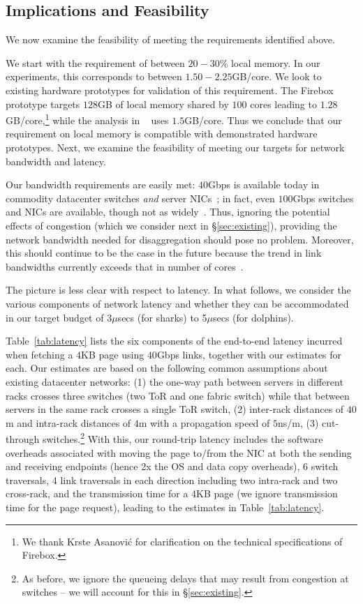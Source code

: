 \subsection{Implications and Feasibility}
\label{ssec:rtt}

We now examine the feasibility of meeting the requirements identified above. 

 We start with the requirement of between $20-30$\% local memory. In our experiments, this corresponds to between $1.50-2.25$GB/core. We look to existing hardware prototypes for validation of this requirement. The Firebox prototype targets $128$GB of local memory shared by $100$ cores leading to $1.28$GB/core,\footnote{We thank Krste Asanovi{\'c} for clarification on the technical specifications of Firebox.} while the analysis in ~\cite{ddcHwDesign1} uses $1.5$GB/core. Thus we conclude that our requirement on local memory is compatible with demonstrated hardware prototypes.
Next, we examine the feasibility of meeting our targets for network bandwidth and latency.


 Our bandwidth requirements are easily met: $40$Gbps is available today in commodity datacenter switches \emph{and} server NICs~\cite{40gnic}; in fact, even $100$Gbps switches and NICs are available, though not as widely~\cite{100gnic}.
Thus, ignoring the potential effects of congestion (which we consider next in \S\ref{sec:existing}), providing the network bandwidth needed for disaggregation should pose no problem. Moreover, this should continue to be the case in the future because the trend in link bandwidths currently exceeds that in number of cores~\cite{hmc1, hmc2, hmc3}.


 The picture is less clear with respect to latency. In what follows, we consider the various components of network latency and whether they can be accommodated in our target budget of 3$\mu$secs (for sharks) to 5$\mu$secs (for dolphins).

Table~\ref{tab:latency} lists the six components of the end-to-end latency incurred when fetching  a $4$KB page using $40$Gbps links, together with our estimates for each. Our estimates are based on the following common assumptions about existing datacenter networks: (1) the one-way path between servers in different racks crosses three switches (two ToR and one fabric switch) while that between servers in the same rack crosses a single ToR switch, (2) inter-rack distances of $40$m and intra-rack distances of $4$m with a propagation speed of $5$ns/m, (3) cut-through switches.\footnote{As before, we ignore the queueing delays that may result from congestion at switches -- we will account for this in \S\ref{sec:existing}.}  
With this, our round-trip latency includes the software overheads associated with moving the page to/from the NIC at both the sending and receiving endpoints (hence 2x the OS and data copy overheads), 6 switch traversals, 4 link traversals in each direction including two intra-rack and two cross-rack, and the transmission time for a 4KB page (we ignore transmission time for the page request), leading to the estimates in Table~\ref{tab:latency}. 

